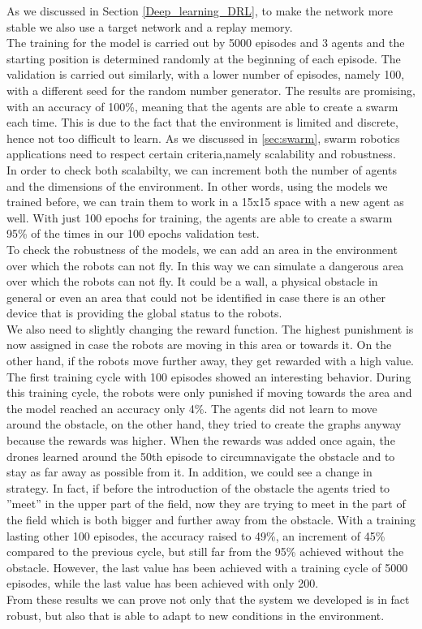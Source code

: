 \documentclass[conference]{IEEEtran}
\begin{document}
As we discussed in Section \ref{Deep_learning_DRL}, to make the network more stable we also use a target network and a replay memory. \\
The training for the model is carried out by 5000 episodes and 3 agents and the starting position is determined randomly at the beginning of each episode. The validation is carried out similarly, with a lower number of episodes, namely 100, with a different seed for the random number generator. The results are promising, with an accuracy of 100\%, meaning that the agents are able to create a swarm each time. This is due to the fact that the environment is limited and discrete, hence not too difficult to learn.
As we discussed in \ref{sec:swarm}, swarm robotics applications need to respect certain criteria,namely  scalability and robustness.  \\
In order to check both scalabilty, we can increment both the number of agents and the dimensions of the environment. In other words, using the models we trained before, we can train them to work in a 15x15 space with a new agent as well. With just 100 epochs for training, the agents are able to create a swarm 95\% of the times in our 100 epochs validation test. \\
To check the robustness of the models, we can add an area in the environment over which the robots can not fly. In this way we can simulate a dangerous area over which the robots can not fly. It could be a wall, a physical obstacle in general or even an area that could not be identified in case there is an other device that is providing the global status to the robots. \\
We also need to slightly changing the reward function. The highest punishment is now assigned in case the robots are moving in this area or towards it. On the other hand, if the robots move further away, they get rewarded with a high value. The first training cycle with 100 episodes showed an interesting behavior. During this training cycle, the robots were only punished if moving towards the area and the model reached an accuracy only 4\%. The agents did not learn to move around the obstacle, on the other hand, they tried to create the graphs anyway because the rewards was higher. When the rewards was added once again, the drones learned around the 50th episode to circumnavigate the obstacle and to stay as far away as possible from it. In addition, we could see a change in strategy. In fact, if before the introduction of the obstacle the agents tried to ''meet'' in the upper part of the field, now they are trying to meet in the part of the field which is both bigger and further away from the obstacle. 
With a training lasting other 100 episodes, the accuracy raised to 49\%, an increment of 45\% compared to the previous cycle, but still far from the 95\% achieved without the obstacle. However, the last  value has been achieved with a training cycle of 5000 episodes, while the last value has been achieved with only 200. \\
From these results we can prove not only that the system we developed is in fact robust, but also that is able to adapt to new conditions in the environment. 
\end{document}

